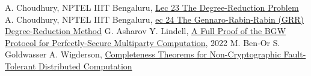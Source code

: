 \documentclass[11pt]{article}
\begin{document}
\begin{thebibliography}{50}
     A. Choudhury, NPTEL IIIT Bengaluru, \href{https://www.youtube.com/watch?v=PVCXg5aad-Q&list=PLgMDNELGJ1Ca3l-xioOzN86BIZ2a0N8Ds&index=24&pp=iAQB}{Lec 23 The Degree-Reduction Problem}
     A. Choudhury, NPTEL IIIT Bengaluru, \href{https://www.youtube.com/watch?v=mae0O89ctlQ&list=PLgMDNELGJ1Ca3l-xioOzN86BIZ2a0N8Ds&index=25&pp=iAQB}{ec 24 The Gennaro-Rabin-Rabin (GRR) Degree-Reduction Method}
     G. Asharov Y. Lindell, \href{https://eprint.iacr.org/2011/136.pdf}{A Full Proof of the BGW Protocol for Perfectly-Secure Multiparty Computation}, 2022
     M. Ben-Or S. Goldwasser A. Wigderson, \href{https://inst.eecs.berkeley.edu/~cs276/fa20/notes/BGW88.pdf}{Completeness Theorems for Non-Cryptographic Fault-Tolerant Distributed Computation}
\end{thebibliography}

\end{document}

